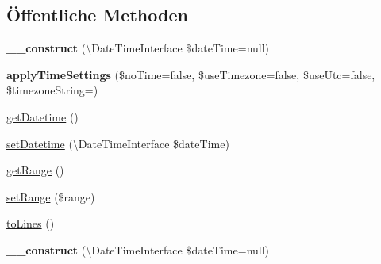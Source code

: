 \subsection*{Öffentliche Methoden}
\begin{DoxyCompactItemize}
\item 
\mbox{\label{class_eluceo_1_1i_cal_1_1_property_1_1_event_1_1_recurrence_id_a30335a89e4b7cdbb5be84a73340542c3}} 
{\bfseries \+\_\+\+\_\+construct} (\textbackslash{}Date\+Time\+Interface \$date\+Time=null)
\item 
\mbox{\label{class_eluceo_1_1i_cal_1_1_property_1_1_event_1_1_recurrence_id_a7c8a81a7760136bce2ff1b93e2b4d541}} 
{\bfseries apply\+Time\+Settings} (\$no\+Time=false, \$use\+Timezone=false, \$use\+Utc=false, \$timezone\+String=\textquotesingle{}\textquotesingle{})
\item 
\mbox{\hyperlink{class_eluceo_1_1i_cal_1_1_property_1_1_event_1_1_recurrence_id_a343360d2494fc6886739593da7867873}{get\+Datetime}} ()
\item 
\mbox{\hyperlink{class_eluceo_1_1i_cal_1_1_property_1_1_event_1_1_recurrence_id_a348cc32d3b8f03cac585f6eb19ee930f}{set\+Datetime}} (\textbackslash{}Date\+Time\+Interface \$date\+Time)
\item 
\mbox{\hyperlink{class_eluceo_1_1i_cal_1_1_property_1_1_event_1_1_recurrence_id_a7f52a0dbb43dcf28fd95a2b1ad386838}{get\+Range}} ()
\item 
\mbox{\hyperlink{class_eluceo_1_1i_cal_1_1_property_1_1_event_1_1_recurrence_id_ae005792e47bec89df30f5db6cb6ab63c}{set\+Range}} (\$range)
\item 
\mbox{\hyperlink{class_eluceo_1_1i_cal_1_1_property_1_1_event_1_1_recurrence_id_ad7bfce37171e9017a413052603b30ca4}{to\+Lines}} ()
\item 
\mbox{\label{class_eluceo_1_1i_cal_1_1_property_1_1_event_1_1_recurrence_id_a30335a89e4b7cdbb5be84a73340542c3}} 
{\bfseries \+\_\+\+\_\+construct} (\textbackslash{}Date\+Time\+Interface \$date\+Time=null)
\item 
\mbox{\label{class_eluceo_1_1i_cal_1_1_property_1_1_event_1_1_recurrence_id_a7c8a81a7760136bce2ff1b93e2b4d541}} 

\end{DoxyCompactItemize}
